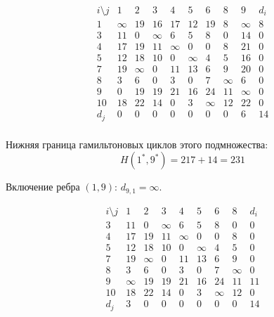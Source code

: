 \documentclass{article}
\begin{document}
\[
    \begin{array}{c|cccccccc|c}
        i \setminus j & 1      & 2      & 3      & 4      & 5      & 6      & 8      & 9      & d_i \\
        \hline
        1             & \infty & 19     & 16     & 17     & 12     & 19     & 8      & \infty & 8   \\
        3             & 11     & 0      & \infty & 6      & 5      & 8      & 0      & 14     & 0   \\
        4             & 17     & 19     & 11     & \infty & 0      & 0      & 8      & 21     & 0   \\
        5             & 12     & 18     & 10     & 0      & \infty & 4      & 5      & 16     & 0   \\
        7             & 19     & \infty & 0      & 11     & 13     & 6      & 9      & 20     & 0   \\
        8             & 3      & 6      & 0      & 3      & 0      & 7      & \infty & 6      & 0   \\
        9             & 0      & 19     & 19     & 21     & 16     & 24     & 11     & \infty & 0   \\
        10            & 18     & 22     & 14     & 0      & 3      & \infty & 12     & 22     & 0   \\
        \hline
        d_j           & 0      & 0      & 0      & 0      & 0      & 0      & 0      & 6      & 14  \\
    \end{array}
\]

Нижняя граница гамильтоновых циклов этого подмножества:
\[
    H(1^*,9^*) = 217 + 14 = 231
\]

Включение ребра $(1,9)$: $d_{9,1}=\infty$.

\[
    \begin{array}{c|ccccccc|c}
        i \setminus j & 1      & 2      & 3      & 4      & 5      & 6      & 8      & d_i \\
        \hline
        3             & 11     & 0      & \infty & 6      & 5      & 8      & 0      & 0   \\
        4             & 17     & 19     & 11     & \infty & 0      & 0      & 8      & 0   \\
        5             & 12     & 18     & 10     & 0      & \infty & 4      & 5      & 0   \\
        7             & 19     & \infty & 0      & 11     & 13     & 6      & 9      & 0   \\
        8             & 3      & 6      & 0      & 3      & 0      & 7      & \infty & 0   \\
        9             & \infty & 19     & 19     & 21     & 16     & 24     & 11     & 11  \\
        10            & 18     & 22     & 14     & 0      & 3      & \infty & 12     & 0   \\
        \hline
        d_j           & 3      & 0      & 0      & 0      & 0      & 0      & 0      & 14  \\
    \end{array}
\]
\end{document}
